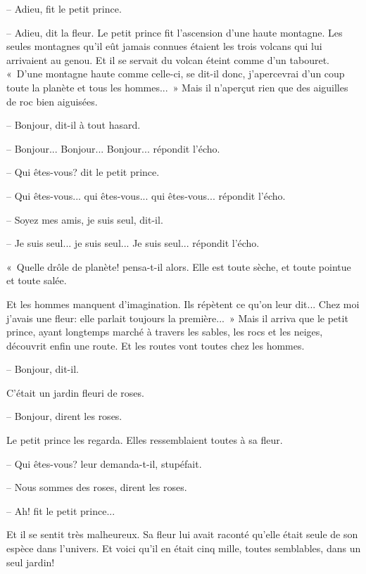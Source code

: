 \documentclass[a4paper]{report}
\begin{document}
-- Adieu, fit le petit prince.

-- Adieu, dit la fleur.
\parachapter{} %
Le petit prince fit l'ascension d'une haute montagne. Les seules montagnes qu'il eût jamais connues étaient les trois volcans qui lui arrivaient au genou. Et il se servait du volcan éteint comme d'un tabouret. «~D'une montagne haute comme celle-ci, se dit-il donc, j'apercevrai d'un coup toute la planète et tous les hommes...~» Mais il n'aperçut rien que des aiguilles de roc bien aiguisées.


-- Bonjour, dit-il à tout hasard.

-- Bonjour... Bonjour... Bonjour... répondit l'écho.

-- Qui êtes-vous? dit le petit prince.

-- Qui êtes-vous... qui êtes-vous... qui êtes-vous... répondit l'écho.

-- Soyez mes amis, je suis seul, dit-il.

-- Je suis seul... je suis seul... Je suis seul... répondit l'écho.

«~Quelle drôle de planète! pensa-t-il alors. Elle est toute sèche, et toute pointue et toute salée.

Et les hommes manquent d'imagination. Ils répètent ce qu'on leur dit... Chez moi j'avais une fleur: elle parlait toujours la première...~»
\parachapter{} %
Mais il arriva que le petit prince, ayant longtemps marché à travers les sables, les rocs et les neiges, découvrit enfin une route. Et les routes vont toutes chez les hommes.

-- Bonjour, dit-il.

C'était un jardin fleuri de roses.

-- Bonjour, dirent les roses.

Le petit prince les regarda. Elles ressemblaient toutes à sa fleur.

-- Qui êtes-vous? leur demanda-t-il, stupéfait.

-- Nous sommes des roses, dirent les roses.

-- Ah! fit le petit prince...

Et il se sentit très malheureux. Sa fleur lui avait raconté qu'elle était seule de son espèce dans l'univers. Et voici qu'il en était cinq mille, toutes semblables, dans un seul jardin!
\end{document}
